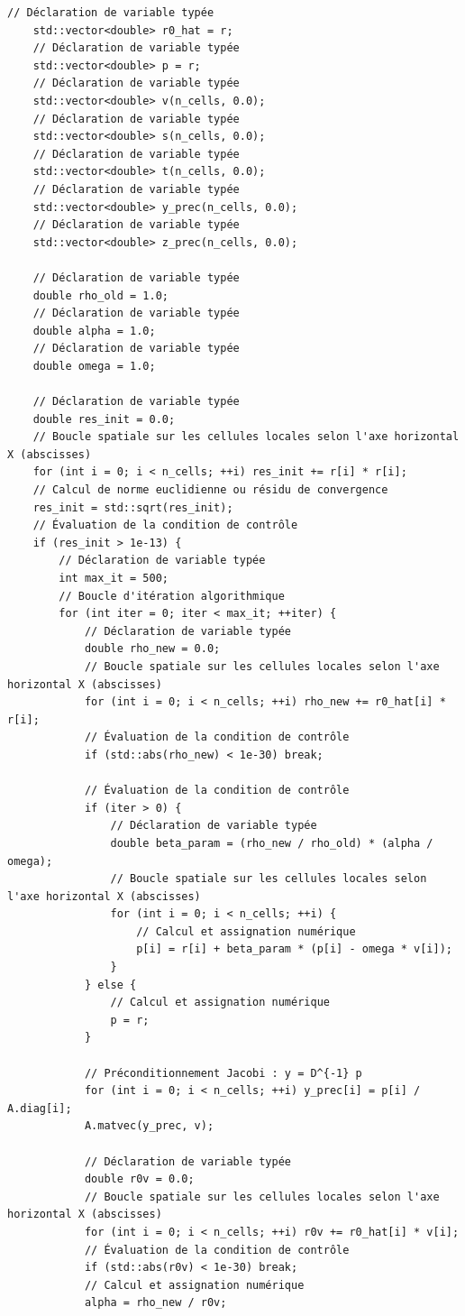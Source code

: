 \documentclass[10pt,a4paper,oneside]{book}
\begin{document}
\begin{lstlisting}[language={[11]C++}]
    // Déclaration de variable typée
    std::vector<double> r0_hat = r;
    // Déclaration de variable typée
    std::vector<double> p = r;
    // Déclaration de variable typée
    std::vector<double> v(n_cells, 0.0);
    // Déclaration de variable typée
    std::vector<double> s(n_cells, 0.0);
    // Déclaration de variable typée
    std::vector<double> t(n_cells, 0.0);
    // Déclaration de variable typée
    std::vector<double> y_prec(n_cells, 0.0);
    // Déclaration de variable typée
    std::vector<double> z_prec(n_cells, 0.0);

    // Déclaration de variable typée
    double rho_old = 1.0;
    // Déclaration de variable typée
    double alpha = 1.0;
    // Déclaration de variable typée
    double omega = 1.0;

    // Déclaration de variable typée
    double res_init = 0.0;
    // Boucle spatiale sur les cellules locales selon l'axe horizontal X (abscisses)
    for (int i = 0; i < n_cells; ++i) res_init += r[i] * r[i];
    // Calcul de norme euclidienne ou résidu de convergence
    res_init = std::sqrt(res_init);
    // Évaluation de la condition de contrôle
    if (res_init > 1e-13) {
        // Déclaration de variable typée
        int max_it = 500;
        // Boucle d'itération algorithmique
        for (int iter = 0; iter < max_it; ++iter) {
            // Déclaration de variable typée
            double rho_new = 0.0;
            // Boucle spatiale sur les cellules locales selon l'axe horizontal X (abscisses)
            for (int i = 0; i < n_cells; ++i) rho_new += r0_hat[i] * r[i];
            // Évaluation de la condition de contrôle
            if (std::abs(rho_new) < 1e-30) break;

            // Évaluation de la condition de contrôle
            if (iter > 0) {
                // Déclaration de variable typée
                double beta_param = (rho_new / rho_old) * (alpha / omega);
                // Boucle spatiale sur les cellules locales selon l'axe horizontal X (abscisses)
                for (int i = 0; i < n_cells; ++i) {
                    // Calcul et assignation numérique
                    p[i] = r[i] + beta_param * (p[i] - omega * v[i]);
                }
            } else {
                // Calcul et assignation numérique
                p = r;
            }

            // Préconditionnement Jacobi : y = D^{-1} p
            for (int i = 0; i < n_cells; ++i) y_prec[i] = p[i] / A.diag[i];
            A.matvec(y_prec, v);

            // Déclaration de variable typée
            double r0v = 0.0;
            // Boucle spatiale sur les cellules locales selon l'axe horizontal X (abscisses)
            for (int i = 0; i < n_cells; ++i) r0v += r0_hat[i] * v[i];
            // Évaluation de la condition de contrôle
            if (std::abs(r0v) < 1e-30) break;
            // Calcul et assignation numérique
            alpha = rho_new / r0v;


\end{lstlisting}
\end{document}
